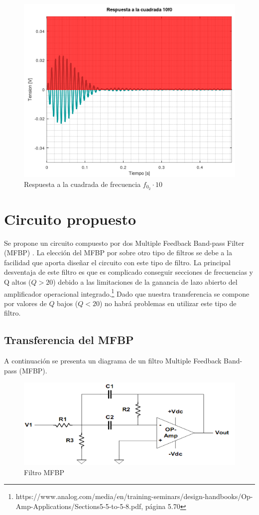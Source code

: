 \documentclass[11pt,a4paper]{report}
\begin{document}
\begin{figure}[ht!]
\includegraphics[scale=1]{RtaCuadradaWo23.png}
\caption{Respuesta a la cuadrada de frecuencia $f_{0_{2}} \cdot 10$}
\end{figure}


\section*{Circuito propuesto}

Se propone un circuito compuesto por dos Multiple Feedback Band-pass Filter (MFBP) . La elección del MFBP por sobre otro tipo de filtros se debe a la 
facilidad que aporta diseñar el circuito con este tipo de filtro. La principal
desventaja de este filtro es que es complicado conseguir secciones de frecuencias y Q altos ($Q > 20$) debido a las limitaciones de la ganancia de lazo abierto del amplificador operacional integrado.\footnote{https://www.analog.com/media/en/training-seminars/design-handbooks/Op-Amp-Applications/Sections5-5-to-5-8.pdf, página 5.70} Dado que nuestra transferencia se compone por valores de $Q$ bajos ($Q < 20$) no habrá problemas en utilizar este tipo de filtro.

\subsection*{Transferencia del MFBP}

A continuación se presenta un diagrama de un filtro Multiple Feedback Band-pass (MFBP).

\begin{figure}[h!]
\includegraphics[scale=0.9]{MFBP.png}
\caption{Filtro MFBP}
\end{figure}
\end{document}
